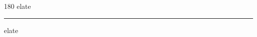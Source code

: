 
\begin{frame}
\begin{center}
\begin{turn}{180}
{\fontsize{2.5cm}{1em}\selectfont elate}
\end{turn}
\vspace{1em}\par  
\hrule
\vspace{1em}\par  
{\fontsize{2.5cm}{1em}\selectfont elate}
\end{center}
\end{frame}
